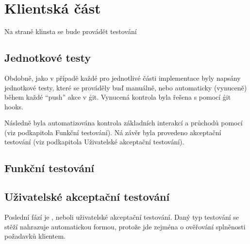 \section{Klientská část}\label{sec:testing-client-app}

Na straně klinsta se bude provádět testování

\subsection{Jednotkové testy}\label{subsec:testing-client-app-unit}

Obdobně, jako v případě každé  pro jednotlivé části implementace byly napsány jednotkové testy, které se prováděly buď manuálně, nebo automaticky (vynuceně) během každé \enquote{push} akce v \h{git}.
Vynucená kontrola byla řešena s pomocí \h{git} hooks.

Následně byla automatizována kontrola základních interakcí a průchodů  pomocí  (viz podkapitola Funkční testování).
Ná závěr byla provedeno akceptační testování (viz podkapitola Uživatelské akceptační testování).



\subsection{Funkční testování}\label{subsec:testing-client-app-functional}


\subsection{Uživatelské akceptační testování}\label{subsec:testing-client-app-acceptance}
Poslední fází je , neboli uživatelské akceptační testování.
Daný typ testování se stěží nahrazuje automatickou formou, protože jde zejména o ověřování splněnosti požadavků klientem.
